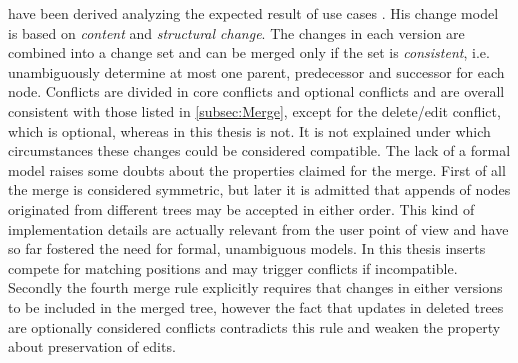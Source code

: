 \documentclass[../Thesis.tex]{subfiles}
\begin{document}
	have been derived analyzing the expected result of use cases \cite{Lind04}.
	His change model is based on \emph{content} and \emph{structural 
	change}. The changes in each version are combined into a change set
	and can be merged only if the set is \emph{consistent}, i.e. 
	unambiguously determine at most one parent, predecessor and successor
	for each node.
	Conflicts are divided in core conflicts and optional conflicts and are 
	overall consistent with those listed in \ref{subsec:Merge}, except
	for the delete/edit conflict, which is optional, whereas in this
	thesis is not. It is not explained under which circumstances these
	changes could be considered compatible.
	The lack of a formal model raises some doubts about the properties
	claimed for the merge.
	First of all the merge is considered symmetric, but later
	it is admitted that appends of nodes originated from different
	trees may be accepted in either order. This kind of implementation
	details are actually relevant from the user point of view and have so 
	far fostered the need for formal, unambiguous models. In this thesis
	inserts compete for matching positions and may trigger conflicts
	if incompatible.
	Secondly the fourth merge rule explicitly requires that changes in either
	versions to be included in the merged tree, however the fact
	that updates in deleted trees are optionally considered conflicts contradicts
	this rule and weaken the property about preservation of edits.
	
	

	
	
\end{document}
